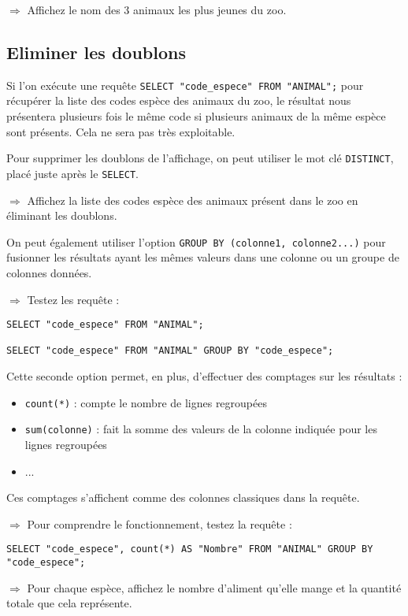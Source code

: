\documentclass[11pt]{article}
\begin{document}
				$\Rightarrow$ Affichez le nom des 3 animaux les plus jeunes du zoo.
				
			
			\subsection{Eliminer les doublons}
				Si l'on exécute une requête \lstinline{SELECT "code_espece" FROM "ANIMAL";} pour récupérer la liste des codes espèce des animaux du zoo, le résultat nous présentera plusieurs fois le même code si plusieurs animaux de la même espèce sont présents. Cela ne sera pas très exploitable.
				
				Pour supprimer les doublons de l'affichage, on peut utiliser le mot clé \lstinline{DISTINCT}, placé juste après le \lstinline{SELECT}.
				
				$\Rightarrow$ Affichez la liste des codes espèce des animaux présent dans le zoo en éliminant les doublons.
				
				On peut également utiliser l'option \lstinline{GROUP BY (colonne1, colonne2...)} pour fusionner les résultats ayant les mêmes valeurs dans une colonne ou un groupe de colonnes données.
				
				$\Rightarrow$ Testez les requête :
				\begin{lstlisting}
SELECT "code_espece" FROM "ANIMAL";

SELECT "code_espece" FROM "ANIMAL" GROUP BY "code_espece";
				\end{lstlisting}
				
				Cette seconde option permet, en plus, d'effectuer des comptages sur les résultats :
				\begin{itemize}
					\item \lstinline{count(*)} : compte le nombre de lignes regroupées
					\item \lstinline{sum(colonne)} : fait la somme des valeurs de la colonne indiquée pour les lignes regroupées
					\item ...
				\end{itemize}
				Ces comptages s'affichent comme des colonnes classiques dans la requête.
				
				$\Rightarrow$ Pour comprendre le fonctionnement, testez la requête :
				\begin{lstlisting}
SELECT "code_espece", count(*) AS "Nombre" FROM "ANIMAL" GROUP BY "code_espece";
				\end{lstlisting}
				
				$\Rightarrow$ Pour chaque espèce, affichez le nombre d'aliment qu'elle mange et la quantité totale que cela représente.
			
\end{document}
